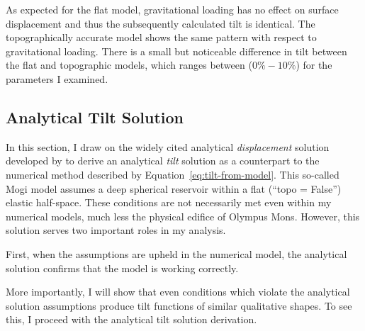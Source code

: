 As expected for the flat model, gravitational loading has no effect on surface displacement and thus the subsequently calculated tilt is identical. The topographically accurate model shows the same pattern with respect to gravitational loading. There is a small but noticeable difference in tilt between the flat and topographic models, which ranges between ($0\%-10\%$) for the parameters I examined.

\subsection{Analytical Tilt Solution}

In this section, I draw on the widely cited analytical \emph{displacement} solution developed by \textcite{mogi_relations_1958} to derive an analytical \emph{tilt} solution as a counterpart to the numerical method described by Equation~\eqref{eq:tilt-from-model}. This so-called Mogi model assumes a deep spherical reservoir within a flat (``topo = False'') elastic half-space. These conditions are not necessarily met even within my numerical models, much less the physical edifice of Olympus Mons. However, this solution serves two important roles in my analysis. 

First, when the assumptions are upheld in the numerical model, the analytical solution confirms that the model is working correctly.

More importantly, I will show that even conditions which violate the analytical solution assumptions produce tilt functions of similar qualitative shapes. To see this, I proceed with the analytical tilt solution derivation.


